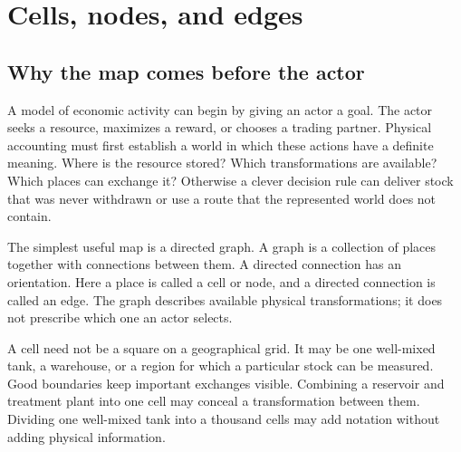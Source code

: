 \chapter{Cells, nodes, and edges}\label{ch:graph}

\section{Why the map comes before the actor}
A model of economic activity can begin by giving an actor a goal. The actor seeks a resource, maximizes a reward, or chooses a trading partner. Physical accounting must first establish a world in which these actions have a definite meaning. Where is the resource stored? Which transformations are available? Which places can exchange it? Otherwise a clever decision rule can deliver stock that was never withdrawn or use a route that the represented world does not contain.

The simplest useful map is a directed graph. A graph is a collection of places together with connections between them. A directed connection has an orientation. Here a place is called a cell or node, and a directed connection is called an edge. The graph describes available physical transformations; it does not prescribe which one an actor selects.

A cell need not be a square on a geographical grid. It may be one well-mixed tank, a warehouse, or a region for which a particular stock can be measured. Good boundaries keep important exchanges visible. Combining a reservoir and treatment plant into one cell may conceal a transformation between them. Dividing one well-mixed tank into a thousand cells may add notation without adding physical information.

